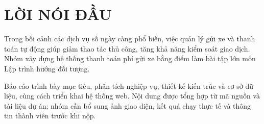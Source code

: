 \chapter*{LỜI NÓI ĐẦU}
Trong bối cảnh các dịch vụ số ngày càng phổ biến, việc quản lý gửi xe và thanh toán tự động giúp giảm thao tác thủ công, tăng khả năng kiểm soát giao dịch. Nhóm xây dựng hệ thống thanh toán phí gửi xe bằng điểm làm bài tập lớn môn Lập trình hướng đối tượng.

Báo cáo trình bày mục tiêu, phân tích nghiệp vụ, thiết kế kiến trúc và cơ sở dữ liệu, cùng cách triển khai hệ thống web. Nội dung được tổng hợp từ mã nguồn và tài liệu dự án; nhóm cần bổ sung ảnh giao diện, kết quả chạy thực tế và thông tin thành viên trước khi nộp.
